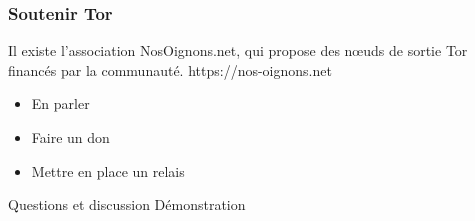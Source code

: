 \documentclass{beamer}
\begin{document}
\begin{frame}
\frametitle{Soutenir Tor}

Il existe l'association NosOignons.net, qui propose des nœuds de sortie Tor financés par la communauté.
 https://nos-oignons.net
\begin{itemize}
\item En parler
\item Faire un don
\item Mettre en place un relais
\end{itemize}
\end{frame}

\begin{frame}
\begin{center}
\Huge{Questions et discussion}
\Huge{Démonstration}
\end{center}
\end{frame}
\end{document}
